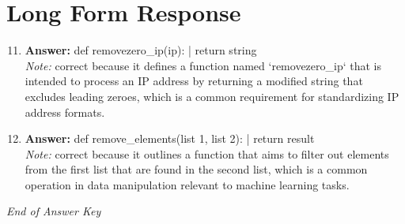 \documentclass[12pt]{article}
\begin{document}
\section*{Long Form Response}
\begin{enumerate}[label=\arabic*.]
\setcounter{enumi}{10}
\item \textbf{Answer:} def removezero\_ip(ip): | return string
\\ \textit{Note:} correct because it defines a function named `removezero\_ip` that is intended to process an IP address by returning a modified string that excludes leading zeroes, which is a common requirement for standardizing IP address formats.
\item \textbf{Answer:} def remove\_elements(list 1, list 2): | return result
\\ \textit{Note:} correct because it outlines a function that aims to filter out elements from the first list that are found in the second list, which is a common operation in data manipulation relevant to machine learning tasks.
\end{enumerate}

\vfill
\noindent\textit{End of Answer Key}
\end{document}
